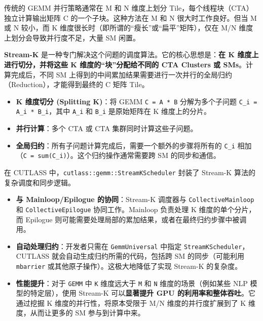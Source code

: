 传统的 GEMM 并行策略通常在 M 和 N 维度上划分 Tile，每个线程块（CTA）独立计算输出矩阵 C 的一个子块。这种方法在 M 和 N 很大时工作良好。但当 M 或 N 较小，而 K 维度很长时（即所谓的“瘦长”或“扁平”矩阵），仅在 M/\allowbreak{}N 维度上划分会导致并行度不足，大量 SM 闲置。

\textbf{Stream-K} 是一种专门解决这个问题的调度算法。它的核心思想是：\textbf{在 K 维度上进行切分，并将这些 K 维度的“块”分配给不同的 CTA Clusters 或 SMs}。计算完成后，不同 SM 上得到的中间累加结果需要进行一次并行的全局归约（Reduction），才能得到最终的 C 矩阵 Tile。

\begin{itemize}
\item \textbf{K 维度切分 (Splitting K)}：将 GEMM \texttt{C = A * B} 分解为多个子问题 \texttt{C\_\allowbreak{}i = A\_\allowbreak{}i * B\_\allowbreak{}i}，其中 \texttt{A\_\allowbreak{}i} 和 \texttt{B\_\allowbreak{}i} 是原始矩阵在 K 维度上的分片。
\item \textbf{并行计算}：多个 CTA 或 CTA 集群同时计算这些子问题。
\item \textbf{全局归约}：所有子问题计算完成后，需要一个额外的步骤将所有的 \texttt{C\_\allowbreak{}i} 相加（\texttt{C = sum(C\_\allowbreak{}i)}）。这个归约操作通常需要跨 SM 的同步和通信。
\end{itemize}

在 CUTLASS 中，\texttt{c\allowbreak{}u\allowbreak{}t\allowbreak{}l\allowbreak{}a\allowbreak{}s\allowbreak{}s\allowbreak{}:\allowbreak{}:\allowbreak{}g\allowbreak{}e\allowbreak{}m\allowbreak{}m\allowbreak{}:\allowbreak{}:\allowbreak{}S\allowbreak{}t\allowbreak{}r\allowbreak{}e\allowbreak{}a\allowbreak{}m\allowbreak{}K\allowbreak{}S\allowbreak{}c\allowbreak{}h\allowbreak{}e\allowbreak{}d\allowbreak{}u\allowbreak{}l\allowbreak{}e\allowbreak{}r} 封装了 Stream-K 算法的复杂调度和同步逻辑。

\begin{itemize}
\item \textbf{与 Mainloop/\allowbreak{}Epilogue 的协同}：Stream-K 调度器与 \texttt{Collective\allowbreak{}Mainloop} 和 \texttt{Collective\allowbreak{}Epilogue} 协同工作。Mainloop 负责处理 K 维度的单个分片，而 Epilogue 则可能需要处理局部的累加结果，或者在最终归约步骤中被调用。
\item \textbf{自动处理归约}：开发者只需在 \texttt{Gemm\allowbreak{}Universal} 中指定 \texttt{Stream\allowbreak{}KScheduler}，CUTLASS 就会自动生成归约所需的代码，包括跨 SM 的同步（可能利用 \texttt{mbarrier} 或其他原子操作）。这极大地降低了实现 Stream-K 的复杂度。
\item \textbf{性能提升}：对于 \texttt{GEMM} 中 \texttt{K} 维度远大于 \texttt{M} 和 \texttt{N} 维度的场景（例如某些 NLP 模型的特定层），使用 Stream-K 可以\textbf{显著提升 GPU 的利用率和整体吞吐}。它通过挖掘 K 维度的并行性，将原本受限于 M/\allowbreak{}N 维度的并行度扩展到了 K 维度，从而让更多的 SM 参与到计算中来。
\end{itemize}

